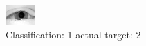 \begin{figure}[h!]
\begin{center}
\includegraphics[width=0.60\columnwidth]{figures/ID2300_class_1_target_2.png}
\end{center}
\caption{ Classification: 1 actual target: 2}
\label{fig:ID2300_class_1_target_2}
\end{figure}
